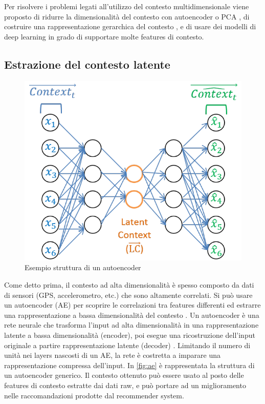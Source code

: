 \documentclass[12pt,italian]{report}
\begin{document}
Per risolvere i problemi legati all'utilizzo del contesto multidimensionale viene proposto di ridurre la dimensionalità del contesto con autoencoder o PCA \cite{latent-context} \cite{context-autoencoder}, di costruire una rappresentazione gerarchica del contesto \cite{hierarchical-context}, e di usare dei modelli di deep learning in grado di supportare molte features di contesto\cite{context-aware-deep-learning}.

\subsection{Estrazione del contesto latente} \label{ssec:latent-context}
\begin{figure}
 \centering
  \includegraphics[scale=0.70]{immagini/autoencoder.png}
  \caption{Esempio struttura di un autoencoder}
  \label{fig:ae}
\end{figure}

Come detto prima, il contesto ad alta dimensionalità è spesso composto da dati di sensori (GPS, accelerometro, etc.) che sono altamente correlati. Si può usare un autoencoder (AE) per scoprire le correlazioni tra features differenti ed estrarre una rappresentazione a bassa dimensionalità del contesto \cite{latent-context}. Un autoencoder è una rete neurale che trasforma l'input ad alta dimensionalità in una rappresentazione latente a bassa dimensionalità (encoder), poi esegue una ricostruzione dell'input originale a partire rappresentazione latente (decoder) \cite{autoencoder}. Limitando il numero di unità nei layers nascosti di un AE, la rete è costretta a imparare una rappresentazione compressa dell'input. In \autoref{fig:ae} è rappresentata la struttura di un autoencoder generico. Il contesto ottenuto può essere usato al posto delle features di contesto estratte dai dati raw, e può portare ad un miglioramento nelle raccomandazioni prodotte dal recommender system.
\end{document}
